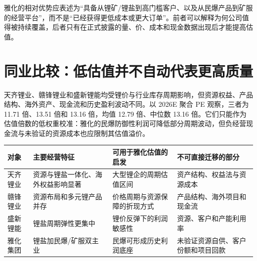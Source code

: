 \begin{keyinsight}[竞争结论]
雅化的相对优势应表述为“具备从锂矿/锂盐到高门槛客户、以及从民爆产品到矿服的经营平台”，而不是“已经获得更低成本或更大订单”。前者可以解释为何公司值得被持续覆盖，后者只有在正式披露的量、价、成本和现金数据出现后才能提高估值。
\end{keyinsight}

\section{同业比较：低估值并不自动代表更高质量}

天齐锂业、赣锋锂业和盛新锂能均受锂价与行业库存周期影响，但资源权益、产品结构、海外资产、现金流和历史盈利波动不同。以 2026E 聚合 PE 观察，三者为 11.71 倍、13.51 倍和 13.16 倍，均值 12.79 倍、中位数 13.16 倍。它们只能作为估值倍数的低权重校准：雅化的民爆防御性利润可降低部分周期波动，但负经营现金流与未验证的资源成本也应限制其估值溢价。

\begin{exhibitbox}
\begin{tabularx}{\exhibitboxwidth}{L{2.6cm}L{2.5cm}X X}
\toprule
对象 & 主要经营特征 & 可用于雅化估值的启发 & 不可直接迁移的部分 \\
\midrule
天齐锂业 & 资源与锂盐一体化、海外权益影响显著 & 大型锂企的周期估值区间 & 资产结构、权益法与资源成本 \\
赣锋锂业 & 资源布局和多元锂产品并存 & 价格周期与资源保障的折现方式 & 产品结构、海外项目和现金流 \\
盛新锂能 & 锂盐周期弹性更集中 & 锂价反弹下的利润敏感性 & 资源、客户和产能利用率 \\
雅化集团 & 锂盐加民爆/矿服双主业 & 民爆可形成历史利润底座 & 未验证资源自供、客户份额和项目回款 \\
\bottomrule
\end{tabularx}
\end{exhibitbox}
